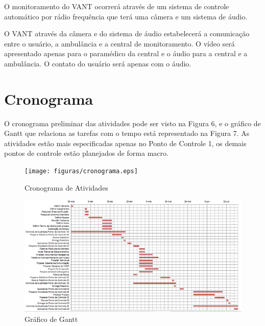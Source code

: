 O monitoramento do VANT ocorrerá através de um sistema de controle automático por rádio frequência que terá uma câmera e um sistema de áudio. 

O VANT através da câmera e do sistema de áudio estabelecerá a comunicação entre o usuário, a ambulância e a central de monitoramento. O vídeo será apresentado apenas para o paramédico da central e o áudio para a central e a ambulância. O contato do usuário será apenas com o áudio.

\section{Cronograma}
O cronograma preliminar das atividades pode ser visto na Figura 6, e o gráfico de Gantt que relaciona as tarefas com o tempo está representado na Figura 7. As atividades estão mais especificadas apenas no Ponto de Controle 1, os demais pontos de controle estão planejados de forma macro.

 \begin{figure}[ht]
	\centering
		\texttt{[image: figuras/cronograma.eps]}
	\caption{Cronograma de Atividades}
\end{figure}

 \begin{figure}[ht]
	\centering
		\includegraphics[keepaspectratio=true,scale=0.9,angle=90]{figuras/gantt.eps}
	\caption{Gráfico de Gantt}
\end{figure}


